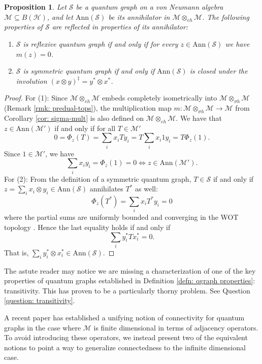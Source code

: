 \documentclass[12pt]{article}
\newtheorem{proposition}[theorem]{Proposition}
\theoremstyle{definition}
\newenvironment{remark}
  {\pushQED{\qed}\renewcommand{\qedsymbol}{\textcircled{\tiny R}}\remarkx}
  {\popQED\endremarkx}
\newcommand{\mc}[1]{\mathcal{#1}}
\newcommand{\<}{\langle}
\renewcommand{\>}{\rangle}
\newcommand{\Ann}{\text{Ann}}
\newcommand{\eh}{\otimes_{eh}}
\begin{document}
\begin{proposition} \label{prop: qr-to-ann}
    Let $\mc S$ be a quantum graph on a von Neumann algebra $\mc M \subseteq B(\mc H)$, and let $\Ann(\mc S)$ be its annihilator in $\mc M \otimes_{eh} \mc M$. The following properties of $\mc S$ are reflected in properties of its annihilator:
    \begin{enumerate}
        \item $\mc S$ is reflexive quantum graph if and only if for every $z \in \Ann(\mc S)$ we have $m(z) = 0$.
        \item $\mc S$ is symmetric quantum graph if and only if $\Ann(\mc S)$ is closed under the involution $(x \otimes y)^\ddagger = y^* \otimes x^*$.
    \end{enumerate}
\end{proposition}
\begin{proof}
    For (1): Since $\mc M \eh \mc M$ embeds completely isometrically into $\mc M \otimes_{\sigma h} \mc M$ (Remark \ref{rmk: predual-tops}), the multiplication map $m: \mc M \otimes_{\sigma h} \mc M \to \mc M$ from Corollary \ref{cor: sigma-mult} is also defined on $\mc M \eh \mc M$. We have that $z \in \Ann(\mc M')$ if and only if for all $T \in \mc M'$
    \[
    0 = \Phi_z(T) = \sum_i x_iTy_i = T \sum_i x_i 1 y_i = T\Phi_z(1).
    \]
    Since $1 \in \mc M'$, we have
    \[
    \sum_i x_i y_i = \Phi_z(1) = 0 \iff z \in \Ann(\mc M').
    \]
    For (2): From the definition of a symmetric quantum graph, $T \in \mc S$ if and only if $z = \sum_i x_i \otimes y_i \in \Ann(\mc S)$ annihilates $T^*$ as well:
    \[
    \Phi_z(T^*) = \sum_i x_i T^* y_i = 0
    \]
    where the partial sums are uniformly bounded and converging in the WOT topology \cite[Theorem 2.2]{blecher-smith-w*h}. Hence the last equality holds if and only if 
    \[
    \sum_i y_i^* T x_i^* = 0.
    \]
    That is, $\sum_i y_i^*\otimes x_i^* \in \Ann(\mc S)$. 
\end{proof}

\begin{remark}
    The astute reader may notice we are missing a characterization of one of the key properties of quantum graphs established in Definition \ref{defn: qgraph properties}: transitivity. This has proven to be a particularly thorny problem. See Question \ref{question: transitivity}.
\end{remark}

A recent paper \cite{connected-qgraphs} has established a unifying notion of connectivity for quantum graphs in the case where $\mc M$ is finite dimensional in terms of adjacency operators. To avoid introducing these operators, we instead present two of the equivalent notions to point a way to generalize connectedness to the infinite dimensional case.
\end{document}

